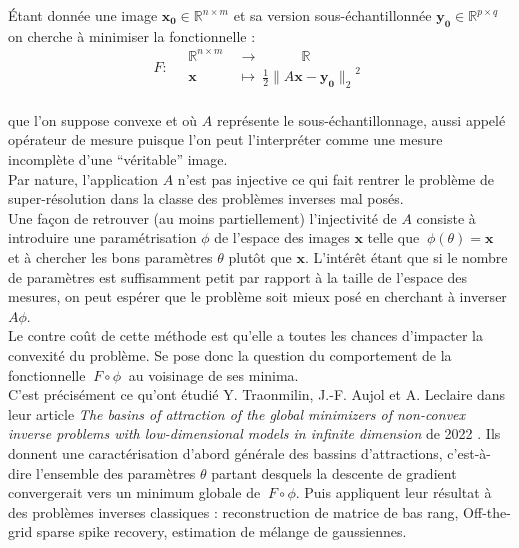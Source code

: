 \documentclass[hidelinks, french]{article} %
\newcommand{\R}{\mathbb{R}}
\newcommand{\lr}{\longrightarrow}
\renewcommand{\bf}[1]{\boldsymbol{#1}}
\theoremstyle{enonce}
\theoremstyle{special}
\theoremstyle{rq}
\theoremstyle{exo}
\theoremstyle{demo}
\begin{document}
Étant donnée une image $\bf{x_0}\in\R^{n\times m}$ et sa version sous-échantillonnée $\bf{y_0}\in\R^{p\times q}$ on cherche à minimiser la fonctionnelle :\begin{equation}\label{eq:F}
	F :\quad \begin{aligned}\R^{n\times m}\ &\lr\qquad\quad \R \\ \bf{x}\quad\ &\longmapsto\ \frac{1}{2}{\big\|A\bf{x}-\bf{y_0}\big\|_2}^2\end{aligned}\end{equation}
\\
que l'on suppose convexe et où $A$ représente le sous-échantillonnage, aussi appelé opérateur de mesure puisque l'on peut l'interpréter comme une mesure incomplète d'une ``véritable'' image.
\\

Par nature, l'application $A$ n'est pas injective ce qui fait rentrer le problème de super-résolution dans la classe des problèmes inverses mal posés.
\\

Une façon de retrouver (au moins partiellement) l'injectivité de $A$ consiste à introduire une paramétrisation $\phi$ de l'espace des images $\bf{x}$ telle que $\ \phi(\theta)=\bf{x}\ $ et à chercher les bons paramètres $\theta$ plutôt que $\bf{x}$. L'intérêt étant que si le nombre de paramètres est suffisamment petit par rapport à la taille de l'espace des mesures, on peut espérer que le problème soit mieux posé en cherchant à inverser $A\phi$.
\\
Le contre coût de cette méthode est qu'elle a toutes les chances d'impacter la convexité du problème. Se pose donc la question du comportement de la fonctionnelle $\ F\circ\phi\ $ au voisinage de ses minima.
\\
C'est précisément ce qu'ont étudié Y. Traonmilin, J.-F. Aujol et A. Leclaire  dans leur article \emph{The basins of attraction of the global minimizers of non-convex inverse problems with low-dimensional models in infinite dimension} de 2022 \cite{traonmilin_basins_2022}. Ils donnent une caractérisation d'abord générale des bassins d'attractions, c'est-à-dire l'ensemble des paramètres $\theta$ partant desquels la descente de gradient convergerait vers un minimum globale de $\ F\circ\phi$. Puis appliquent leur résultat à des problèmes inverses classiques : reconstruction de matrice de bas rang, Off-the-grid sparse spike recovery, estimation de mélange de gaussiennes.
\\
\end{document}
